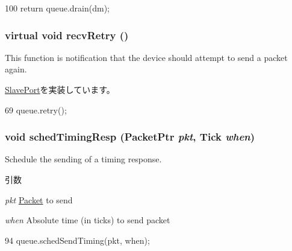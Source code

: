 \begin{DoxyCode}
100 { return queue.drain(dm); }
\end{DoxyCode}
\hypertarget{classQueuedSlavePort_a7ec461ad187b82b4b21e27c86e45cf9c}{
\subsubsection[{recvRetry}]{\setlength{\rightskip}{0pt plus 5cm}virtual void recvRetry ()}}
\label{classQueuedSlavePort_a7ec461ad187b82b4b21e27c86e45cf9c}
This function is notification that the device should attempt to send a packet again. 

\hyperlink{classSlavePort_ac1ccc3bcf7ebabb20b57fab99b2be5b0}{SlavePort}を実装しています。


\begin{DoxyCode}
69 { queue.retry(); }
\end{DoxyCode}
\hypertarget{classQueuedSlavePort_a31c2fe79e7cbd7319eb327074e412675}{
\subsubsection[{schedTimingResp}]{\setlength{\rightskip}{0pt plus 5cm}void schedTimingResp ({\bf PacketPtr} {\em pkt}, \/  {\bf Tick} {\em when})}}
\label{classQueuedSlavePort_a31c2fe79e7cbd7319eb327074e412675}
Schedule the sending of a timing response.


\begin{DoxyParams}{引数}
\item[{\em pkt}]\hyperlink{classPacket}{Packet} to send \item[{\em when}]Absolute time (in ticks) to send packet \end{DoxyParams}



\begin{DoxyCode}
94     { queue.schedSendTiming(pkt, when); }
\end{DoxyCode}


